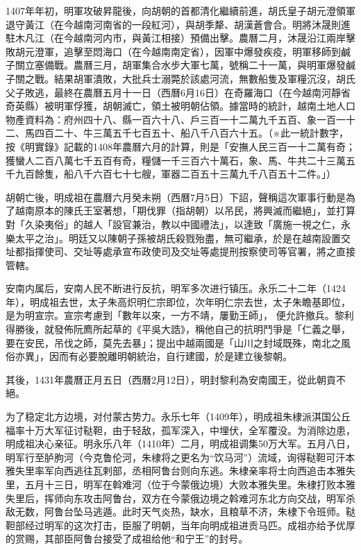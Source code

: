 1407年年初，明軍攻破昇龍後，向胡朝的首都清化繼續前進，胡氏皇子胡元澄領軍退守黃江（在今越南河南省的一段紅河），與胡季犛、胡漢蒼會合。明將沐晟則進駐木凡江（在今越南河内市，與黃江相接）預備出擊。農曆二月，沐晟沿江兩岸擊敗胡元澄軍，追擊至悶海口（在今越南南定省），因軍中爆發疾疫，明軍移師到鹹子關立塞備戰。農曆三月，胡軍集合水步大軍七萬，號稱二十一萬，與明軍爆發鹹子關之戰。結果胡軍潰敗，大批兵士溺斃於該處河流，無數船隻及軍糧沉沒，胡氏父子敗逃，最終在農曆五月十一日（西曆6月16日）在奇羅海口（在今越南河靜省奇英縣）被明軍俘獲，胡朝滅亡，領土被明朝佔領。據當時的統計，越南土地人口物產資料為：府州四十八、縣一百六十八、戶三百一十二萬九千五百、象一百一十二、馬四百二十、牛三萬五千七百五十、船八千八百六十五。（※此一統計數字，按《明實錄》記載的1408年農曆六月的計算，則是「安撫人民三百一十二萬有奇；獲蠻人二百八萬七千五百有奇，糧儲一千三百六十萬石，象、馬、牛共二十三萬五千九百餘隻，船八千六百七十七艘，軍器二百五十三萬九千八百五十二件。」）

胡朝亡後，明成祖在農曆六月癸未朔（西曆7月5日）下詔，聲稱這次軍事行動是為了越南原本的陳氏王室著想，「期伐罪（指胡朝）以吊民，將興滅而繼絕」，並打算對「久染夷俗」的越人「設官兼治，教以中國禮法」，以達致「廣施一視之仁，永樂太平之治」。明廷又以陳朝子孫被胡氏殺戮殆盡，無可繼承，於是在越南設置交址都指揮使司、交址等處承宣布政使司及交址等處提刑按察使司等官署，將之直接管轄。

安南内属后，安南人民不断进行反抗，明军多次进行镇压。永乐二十二年（1424年），明成祖去世，太子朱高炽明仁宗即位，次年明仁宗去世，太子朱瞻基即位，是为明宣宗。宣宗考慮到「數年以來，一方不靖，屢勤王師」， 便允許撤兵。黎利得勝後，就發佈阮廌所起草的《平吳大誥》，稱他自己的抗明鬥爭是「仁義之舉，要在安民，吊伐之師，莫先去暴」；提出中越兩國是「山川之封域既殊，南北之風俗亦異」，因而有必要脫離明朝統治，自行建國，於是建立後黎朝。

其後，1431年農曆正月五日（西曆2月12日），明封黎利為安南國王，從此朝貢不絕。

为了稳定北方边境，对付蒙古势力。永乐七年（1409年），明成祖朱棣派淇国公丘福率十万大军征讨鞑靼，由于轻敌，孤军深入，中埋伏，全军覆没。为消除边患，明成祖决心亲征。明永乐八年（1410年）二月，明成祖调集50万大军。五月八日，明军行至胪朐河（今克鲁伦河，朱棣将之更名为“饮马河”）流域，询得鞑靼可汗本雅失里率军向西逃往瓦剌部，丞相阿鲁台则向东逃。朱棣亲率将士向西追击本雅失里，五月十三日，明军在斡难河（位于今蒙俄边境）大败本雅失里。朱棣打败本雅失里后，挥师向东攻击阿鲁台，双方在今蒙俄边境之斡难河东北方向交战，明军杀敌无数，阿鲁台坠马逃遁。此时天气炎热，缺水，且粮草不济，朱棣下令班师。鞑靼部经过明军的这次打击，臣服了明朝，当年向明成祖进贡马匹。成祖亦给予优厚的赏赐，其部臣阿鲁台接受了成祖给他“和宁王”的封号。

